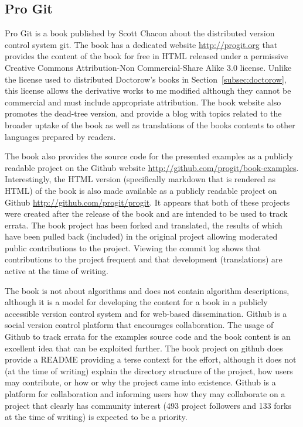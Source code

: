 \documentclass[a4paper, 11pt]{article}
\begin{document}
% 
% 
\subsection{Pro Git}
Pro Git is a book published by Scott Chacon \cite{Chacon2009} about the distributed version control system git. The book has a dedicated website \url{http://progit.org} that provides the content of the book for free in HTML released under a permissive Creative Commons Attribution-Non Commercial-Share Alike 3.0 license. Unlike the license used to distributed Doctorow's books in Section~\ref{subsec:doctorow}, this license allows the derivative works to me modified although they cannot be commercial and must include appropriate attribution. The book website also promotes the dead-tree version, and provide a blog with topics related to the broader uptake of the book as well as translations of the books contents to other languages prepared by readers.
 
The book also provides the source code for the presented examples as a publicly readable project on the Github website \url{http://github.com/progit/book-examples}. Interestingly, the HTML version (specifically markdown that is rendered as HTML) of the book is also made available as a publicly readable project on Github \url{http://github.com/progit/progit}. It appears that both of these projects were created after the release of the book and are intended to be used to track errata. The book project has been forked and translated, the results of which have been pulled back (included) in the original project allowing moderated public contributions to the project. Viewing the commit log shows that contributions to the project frequent and that development (translations) are active at the time of writing.

The book is not about algorithms and does not contain algorithm descriptions, although it is a model for developing the content for a book in a publicly accessible version control system and for web-based dissemination. Github is a social version control platform that encourages collaboration. The usage of Github to track errata for the examples source code and the book content is an excellent idea that can be exploited further. 
The book project on github does provide a README providing a terse context for the effort, although it does not (at the time of writing) explain the directory structure of the project, how users may contribute, or how or why the project came into existence. Github is a platform for collaboration and informing users how they may collaborate on a project that clearly has community interest (493 project followers and 133 forks at the time of writing) is expected to be a priority. 
\end{document}
